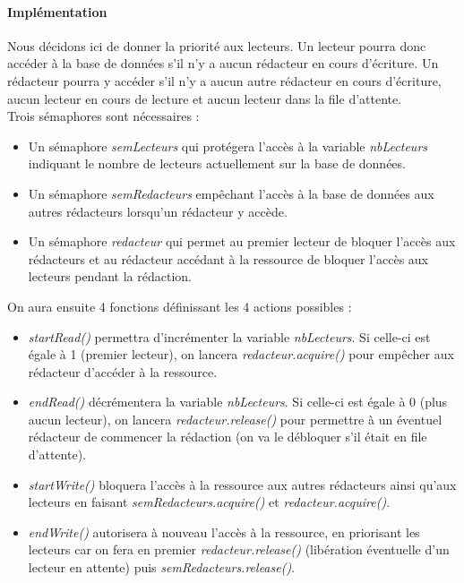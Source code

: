 \documentclass[12pt]{article}
\begin{document}
\paragraph{Implémentation\\}
Nous décidons ici de donner la priorité aux lecteurs. Un lecteur pourra donc accéder à la base de données s'il n'y a aucun rédacteur en cours d'écriture. Un rédacteur pourra y accéder s'il n'y a aucun autre rédacteur en cours d'écriture, aucun lecteur en cours de lecture et aucun lecteur dans la file d'attente. \\
Trois sémaphores sont nécessaires :
\begin{itemize}
  \item Un sémaphore \textit{semLecteurs} qui protégera l'accès à la variable \textit{nbLecteurs} indiquant le nombre de lecteurs actuellement sur la base de données.
  \item Un sémaphore \textit{semRedacteurs} empêchant l'accès à la base de données aux autres rédacteurs lorsqu'un rédacteur y accède.
  \item Un sémaphore \textit{redacteur} qui permet au premier lecteur de bloquer l'accès aux rédacteurs et au rédacteur accédant à la ressource de bloquer l'accès aux lecteurs pendant la rédaction.
\end{itemize}
On aura ensuite 4 fonctions définissant les 4 actions possibles :
\begin{itemize}
  \item \textit{startRead()} permettra d'incrémenter la variable \textit{nbLecteurs}. Si celle-ci est égale à 1 (premier lecteur), on lancera \textit{redacteur.acquire()} pour empêcher aux rédacteur d'accéder à la ressource.
  \item \textit{endRead()} décrémentera la variable \textit{nbLecteurs}. Si celle-ci est égale à 0 (plus aucun lecteur), on lancera \textit{redacteur.release()} pour permettre à un éventuel rédacteur de commencer la rédaction (on va le débloquer s'il était en file d'attente).
  \item \textit{startWrite()} bloquera l'accès à la ressource aux autres rédacteurs ainsi qu'aux lecteurs en faisant \textit{semRedacteurs.acquire()} et \textit{redacteur.acquire()}.
  \item \textit{endWrite()} autorisera à nouveau l'accès à la ressource, en priorisant les lecteurs car on fera en premier \textit{redacteur.release()} (libération éventuelle d'un lecteur en attente) puis \textit{semRedacteurs.release()}.
\end{itemize}
\end{document}
